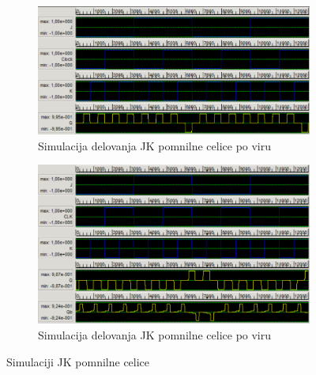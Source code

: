 \documentclass[a4paper, 11pt]{article}
\begin{document}
\begin{figure}[h!]
	\begin{subfigure}[b]{\textwidth}
	\includegraphics[width=\textwidth]{../img/vir_4/sim_jk.png}
	\caption{Simulacija delovanja JK pomnilne celice po viru \cite{quantum_dot}}
	\label{fig-jk-1-sim}
	\end{subfigure}
	\begin{subfigure}[b]{\textwidth}
	\includegraphics[width=\textwidth]{../img/vir_5/sim_jk.png}
	\caption{Simulacija delovanja JK pomnilne celice po viru \cite{a_novel_approach}}
	\label{fig-jk-2-sim}
	\end{subfigure}
	\caption{Simulaciji JK pomnilne celice}
	\label{fig-jk-sim}
\end{figure}
\end{document}
